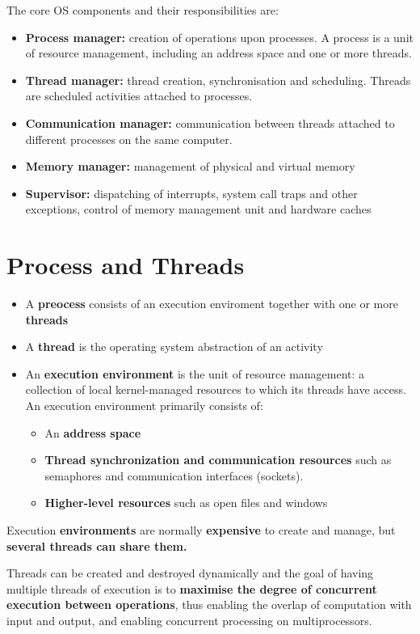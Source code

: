 The core OS components and their responsibilities are:
\begin{itemize}
    \item \textbf{Process manager:} creation of operations upon processes. A process is a unit of resource management, including an address space and one or more threads.
    \item \textbf{Thread manager:} thread creation, synchronisation and scheduling. Threads are scheduled activities attached to processes.
    \item \textbf{Communication manager:} communication between threads attached to different processes on the same computer.
    \item \textbf{Memory manager:} management of physical and virtual memory
    \item \textbf{Supervisor:} dispatching of interrupts, system call traps and other exceptions, control of memory management unit and hardware caches
\end{itemize}

\section{Process and Threads}
\begin{itemize}
    \item A \textbf{preocess} consists of an execution enviroment together with one or more \textbf{threads}
    \item A \textbf{thread} is the operating system abstraction of an activity
    \item An \textbf{execution environment} is the unit of resource management: a collection of local kernel-managed resources to which its threads have access. An execution environment primarily consists of:
        \begin{itemize}
            \item An \textbf{address space}
            \item \textbf{Thread synchronization and communication resources} such as semaphores and communication interfaces (sockets).
            \item \textbf{Higher-level resources} such as open files and windows
        \end{itemize}
\end{itemize}
Execution \textbf{environments} are normally \textbf{expensive} to create and manage, but \textbf{several threads can share them.}

Threads can be created and destroyed dynamically and the goal of having multiple threads of execution is to \textbf{maximise the degree of concurrent execution between operations}, thus enabling the overlap of computation with input and output, and enabling concurrent processing on multiprocessors.

